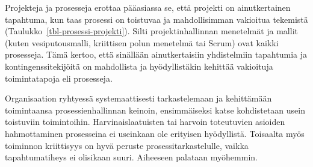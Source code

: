 \documentclass[
  finnish,
  letterpaper,
  DIV=11,
  numbers=noendperiod,
  oneside]{scrreprt}
\begin{document}
Projekteja ja prosesseja erottaa pääasiassa se, että projekti on
ainutkertainen tapahtuma, kun taas prosessi on toistuvaa ja
mahdollisimman vakioitua tekemistä
(Taulukko~\ref{tbl-prosessi-projekti}). Silti projektinhallinnan
menetelmät ja mallit (kuten vesiputousmalli, kriittisen polun menetelmä
tai Scrum) ovat kaikki prosesseja. Tämä kertoo, että sinällään
ainutkertaisiin yhdistelmiin tapahtumia ja kontingenssitekijöitä on
mahdollista ja hyödyllistäkin kehittää vakioituja toimintatapoja eli
prosesseja.

Organisaation ryhtyessä systemaattisesti tarkastelemaan ja kehittämään
toimintaansa prosessienhallinnan keinoin, ensimmäiseksi katse
kohdistetaan usein toistuviin toimintoihin. Harvinaislaatuisten tai
harvoin toteutuvien asioiden hahmottaminen prosesseina ei useinkaan ole
erityisen hyödyllistä. Toisaalta myös toiminnon kriittisyys on hyvä
peruste prosessitarkastelulle, vaikka tapahtumatiheys ei olisikaan
suuri. Aiheeseen palataan myöhemmin.
\end{document}
